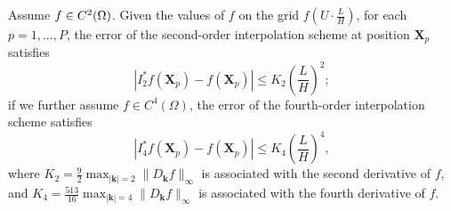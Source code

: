 \documentclass[review,onefignum,onetabnum]{siamart250211}
\begin{document}
\begin{lemma}
\label{Thm:G2P}
Assume \(f \in \\C^2(\Omega)\). Given the values of \( f \) on the grid \( f\left(U \cdot \frac{L}{H}\right) \), for each \( p = 1,..., P \), the error of the second-order interpolation scheme at position \( \mathbf{X}_p \) satisfies 
\begin{equation}
|I^*_2 f(\mathbf{X}_p) - f(\mathbf{X}_p)| \leq K_2 \left(\frac{L}{H}\right)^2;
\end{equation}
if we further assume \(f \in C^4(\Omega)\), the error of the fourth-order interpolation scheme satisfies
\begin{equation}
|I^*_4 f(\mathbf{X}_p) - f(\mathbf{X}_p)| \leq K_4 \left(\frac{L}{H}\right)^4,
\end{equation}
where \(K_2 = \frac{9}{2} \max_{|\mathbf{k}|=2} \|D_\mathbf{k} f\|_\infty\) is associated with the second derivative of \( f \), and \(K_4 = \frac{513}{16} \max_{|\mathbf{k}|=4} \|D_\mathbf{k} f\|_\infty\) is associated with the fourth derivative of \( f \).
\end{lemma}
\end{document}
